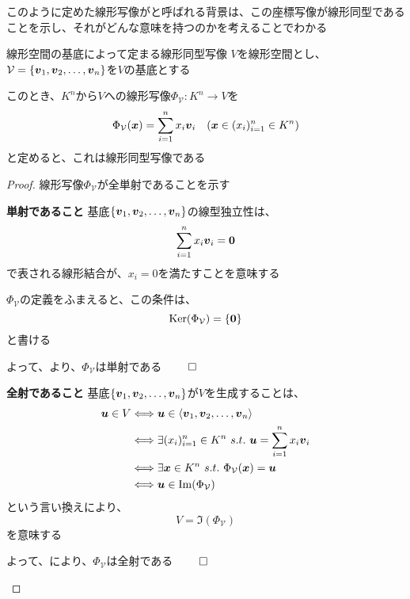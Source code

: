 \documentclass[../../../topic_linear-algebra]{subfiles}
\begin{document}
このように定めた線形写像がと呼ばれる背景は、この座標写像が線形同型であることを示し、それがどんな意味を持つのかを考えることでわかる

\begin{theorem*}{線形空間の基底によって定まる線形同型写像}
  $V$を線形空間とし、$\mathcal{V} = \{ \vb*{v}_1, \vb*{v}_2, \dots, \vb*{v}_n \}$を$V$の基底とする

  このとき、$K^n$から$V$への線形写像$\Phi_{\mathcal{V}}\colon K^n \to V$を
  \begin{equation*}
    \Phi_{\mathcal{V}}(\vb*{x}) = \sum_{i=1}^n x_i \vb*{v}_i \quad (\vb*{x} \in (x_i)_{i=1}^n \in K^n)
  \end{equation*}
  と定めると、これは線形同型写像である
\end{theorem*}

\begin{proof}
  線形写像$\Phi_{\mathcal{V}}$が全単射であることを示す

  \begin{subpattern}{\bfseries 単射であること}
    基底$\{ \vb*{v}_1, \vb*{v}_2, \dots, \vb*{v}_n \}$の線型独立性は、
    \begin{equation*}
      \sum_{i=1}^n x_i \vb*{v}_i = \vb*{0}
    \end{equation*}
    で表される線形結合が、$x_i = 0$を満たすことを意味する

    $\Phi_{\mathcal{V}}$の定義をふまえると、この条件は、
    \begin{equation*}
      \operatorname{Ker}(\Phi_{\mathcal{V}}) = \{ \vb*{0} \}
    \end{equation*}
    と書ける

    よって、より、$\Phi_{\mathcal{V}}$は単射である $\qed$
  \end{subpattern}

  \begin{subpattern}{\bfseries 全射であること}
    基底$\{ \vb*{v}_1, \vb*{v}_2, \dots, \vb*{v}_n \}$が$V$を生成することは、
    \begin{align*}
      \vb*{u} \in V & \Longleftrightarrow \vb*{u} \in \langle \vb*{v}_1, \vb*{v}_2, \dots, \vb*{v}_n \rangle           \\
                    & \Longleftrightarrow \exists (x_i)_{i=1}^n \in K^n \,\, s.t. \,\, \vb*{u} = \sum_{i=1}^n x_i \vb*{v}_i \\
                    & \Longleftrightarrow \exists \vb*{x} \in K^n \,\, s.t. \,\, \Phi_{\mathcal{V}}(\vb*{x}) = \vb*{u}      \\
                    & \Longleftrightarrow \vb*{u} \in \Im(\Phi_{\mathcal{V}})
    \end{align*}
    という言い換えにより、
    \begin{equation*}
      V = \Im(\Phi_{\mathcal{V}})
    \end{equation*}
    を意味する

    よって、により、$\Phi_{\mathcal{V}}$は全射である $\qed$
  \end{subpattern}
\end{proof}
\end{document}
